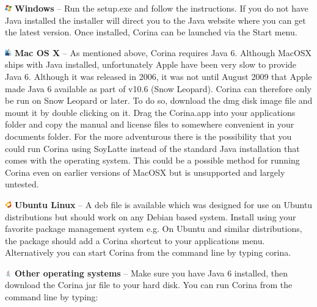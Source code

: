 \begin{description}
\item \includegraphics[width=3mm]{Images/windows.png} \textbf{Windows} -- Run the setup.exe and follow the instructions. If you do not have Java installed the installer will direct you to the Java website where you can get the latest version. Once installed, Corina can be launched via the Start menu.

\item \includegraphics[width=3mm]{Images/mac.png} \textbf{Mac OS X} -- As mentioned above, Corina requires Java 6. Although MacOSX ships with Java installed, unfortunately Apple have been very slow to provide Java 6. Although it was released in 2006, it was not until August 2009 that Apple made Java 6 available as part of v10.6 (Snow Leopard). Corina can therefore only be run on Snow Leopard or later. To do so, download the dmg disk image file and mount it by double clicking on it. Drag the Corina.app into your applications folder and copy the manual and license files to somewhere convenient in your documents folder.  For the more adventurous there is the possibility that you could run Corina using SoyLatte instead of the standard Java installation that comes with the operating system.  This could be a possible method for running Corina even on earlier versions of MacOSX but is unsupported and largely untested.

\item \includegraphics[width=3mm]{Images/ubuntu.png} \textbf{Ubuntu Linux} --  A deb file is available which was designed for use on Ubuntu distributions but should work on any Debian based system. Install using your favorite package management system e.g.  On Ubuntu and similar distributions, the package should add a Corina shortcut to your applications menu. Alternatively you can start Corina from the command line by typing corina.

\item \includegraphics[width=3mm]{Images/java.png} \textbf{Other operating systems} -- Make sure you have Java 6 installed, then download the Corina jar file to your hard disk. You can run Corina from the command line by typing: 
\end{description}

